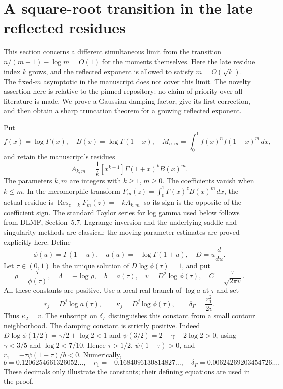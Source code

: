 \section{A square-root transition in the late reflected residues}
\label{moderate:sec}

This section concerns a different simultaneous limit from the transition
$n/(m+1)-\log m=O(1)$ for the moments themselves. Here the late residue
index $k$ grows, and the reflected exponent is allowed to satisfy
$m=O(\sqrt{k})$. The fixed-$m$ asymptotic in the manuscript does not
cover this limit. The novelty assertion here is relative to the pinned
repository: no claim of priority over all literature is made. We prove a Gaussian damping factor, give its first
correction, and then obtain a sharp truncation theorem for a growing
reflected exponent.

Put
\[
 f(x)=\log\Gamma(x),\quad B(x)=\log\Gamma(1-x),\quad
 M_{n,m}=\int_0^1 f(x)^n f(1-x)^m\,dx,
\]
and retain the manuscript's residues
\begin{equation}\label{moderate:eq:A}
 A_{k,m}=\frac1k[x^{k-1}]\Gamma(1+x)^k B(x)^m.
\end{equation}
The parameters $k,m$ are integers with $k\ge1$, $m\ge0$.
The coefficients vanish when $k\le m$. In the meromorphic transform
$F_m(z)=\int_0^1\Gamma(x)^zB(x)^m\,dx$, the actual residue is
$\operatorname*{Res}_{z=k}F_m(z)=-kA_{k,m}$, so its sign is the
opposite of the coefficient sign. The standard Taylor series
for log gamma used below follows from DLMF, Section~5.7\cite{moderate:DLMF}.
Lagrange inversion and the underlying saddle and singularity methods are
classical\cite{moderate:Gessel,moderate:FS}; the moving-parameter estimates
are proved explicitly here.
Define
\[
 \phi(u)=\Gamma(1-u),\quad a(u)=-\log\Gamma(1+u),\quad D=u\frac d{du}.
\]
Let $\tau\in(0,1)$ be the unique solution of
$D\log\phi(\tau)=1$, and put
\begin{equation}\label{moderate:eq:constants}
 \rho=\frac{\tau}{\phi(\tau)},\quad
 \Lambda=-\log\rho,\quad b=a(\tau),\quad
 v=D^2\log\phi(\tau),\quad
 C=\frac{\tau}{\sqrt{2\pi v}}.
\end{equation}
All these constants are positive. Use a local real branch of $\log a$
at $\tau$ and set
\begin{equation}\label{moderate:eq:derivatives}
 r_j=D^j\log a(\tau),\qquad
 \kappa_j=D^j\log\phi(\tau),\qquad
 \delta_\Gamma=\frac{r_1^2}{2v}.
\end{equation}
Thus $\kappa_2=v$. The subscript on $\delta_\Gamma$ distinguishes this
constant from a small contour neighborhood.
The damping constant is strictly positive. Indeed
$D\log\phi(1/2)=\gamma/2+\log2<1$ and
$\psi(3/2)=2-\gamma-2\log2>0$, using
$\gamma<3/5$ and $\log2<7/10$. Hence $\tau>1/2$,
$\psi(1+\tau)>0$, and
$r_1=-\tau\psi(1+\tau)/b<0$.
Numerically,
\[
 b=0.1206254661326052\ldots,\quad
 r_1=-0.1684096130814827\ldots,\quad
 \delta_\Gamma=0.00624269203454726\ldots.
\]
These decimals only illustrate the constants; their defining equations
are used in the proof.

